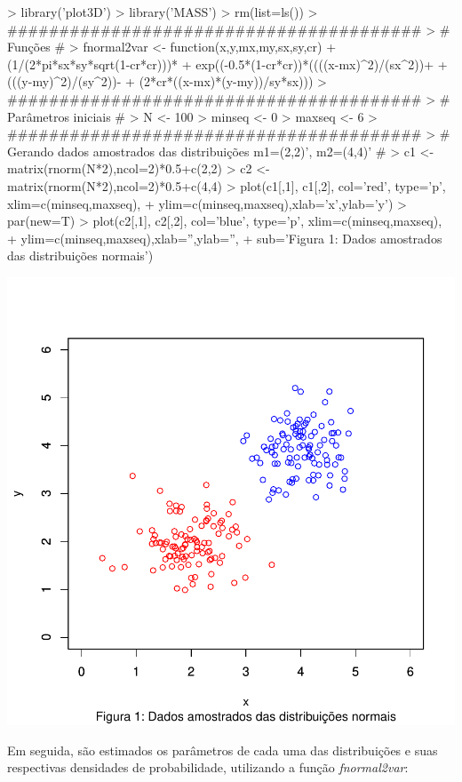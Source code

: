 \documentclass{article}
\begin{document}
\begin{Schunk}
\begin{Sinput}
> library('plot3D')
> library('MASS')
> rm(list=ls())
> ########################################
> # Funções #
> fnormal2var <- function(x,y,mx,my,sx,sy,cr){
+   (1/(2*pi*sx*sy*sqrt(1-cr*cr)))*
+     exp((-0.5*(1-cr*cr))*((((x-mx)^2)/(sx^2))+
+                             (((y-my)^2)/(sy^2))-
+                             (2*cr*((x-mx)*(y-my))/sy*sx)))}
> ########################################
> # Parâmetros iniciais #
> N <- 100
> minseq <- 0
> maxseq <- 6
> ########################################
> # Gerando dados amostrados das distribuições m1=(2,2)', m2=(4,4)' #
> c1 <- matrix(rnorm(N*2),ncol=2)*0.5+c(2,2)
> c2 <- matrix(rnorm(N*2),ncol=2)*0.5+c(4,4)
> plot(c1[,1], c1[,2], col='red', type='p', xlim=c(minseq,maxseq), 
+      ylim=c(minseq,maxseq),xlab='x',ylab='y')
> par(new=T)
> plot(c2[,1], c2[,2], col='blue', type='p', xlim=c(minseq,maxseq), 
+      ylim=c(minseq,maxseq),xlab='',ylab='',
+      sub='Figura 1: Dados amostrados das distribuições normais')
\end{Sinput}
\end{Schunk}
\includegraphics{gaussr2-001}

Em seguida, são estimados os parâmetros de cada uma das distribuições e suas respectivas densidades de probabilidade, utilizando a função \textit{fnormal2var}:
\end{document}
